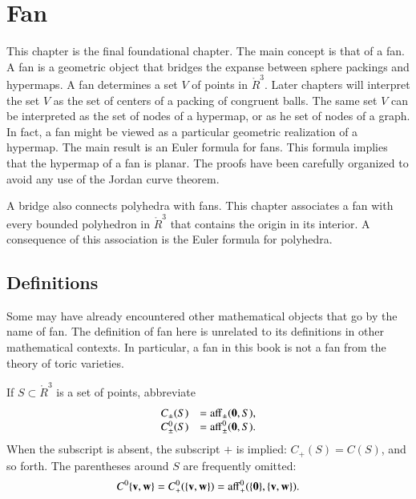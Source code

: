 
\chapter{Fan}\label{sec:fan}




\begin{summary}
This chapter is the final foundational chapter.  The main concept is
that of a fan.  A fan is a geometric object that bridges the expanse
between sphere packings and hypermaps.  A fan determines a set $V$
of points in $\ring{R}^3$.  Later chapters will interpret the set
$V$ as the set of centers of a packing of congruent balls.  The same
set $V$ can be interpreted as the set of nodes of a hypermap, or as
he set of nodes of a graph.  In fact, a fan might be viewed as a
particular geometric realization of a hypermap.  The main result is
an Euler formula for fans.  This formula implies that the hypermap
of a fan is planar.  The proofs have been carefully organized to
avoid any use of the Jordan curve theorem.


A bridge also connects polyhedra with fans.  This chapter associates
a fan with every bounded polyhedron in $\ring{R}^3$ that contains
the origin in its interior.  A consequence of this association is
the Euler formula for polyhedra.
\end{summary}


%
%
%
%
%

\section{Definitions}



\begin{remark}
Some may have already encountered other mathematical objects that go
by the name of fan.  The definition of fan here is unrelated to its
definitions in other mathematical contexts.  In particular, a fan in
this book is not a fan from the theory of toric varieties.
\end{remark}



If $S\subset\ring{R}^3$ is a set of points,
abbreviate
\begin{displaymath}
\begin{array}{lll}
C_\pm(S) &= {\operatorname{aff}}_\pm({\mathbf 0},S),\\
C^0_\pm(S) &= {\operatorname{aff}}^0_\pm({\mathbf 0},S).\\
\end{array}
\end{displaymath}
When the subscript is absent, the subscript $+$ is implied: $C_+(S)
= C(S)$, and so forth.  The parentheses around $S$ are frequently
omitted:
\begin{displaymath}C^0\{{\mathbf v},{\mathbf w}\}=C^0_+(\{{\mathbf v},{\mathbf w}\}) =
{\operatorname{aff}}^0_+(\{{\mathbf 0}\},\{{\mathbf v},{\mathbf w}\}).\end{displaymath}

